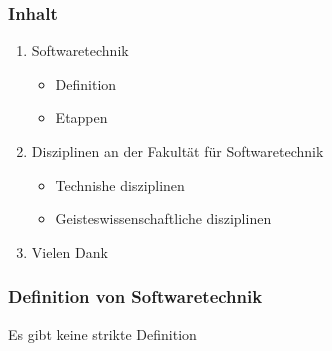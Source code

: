 \documentclass{beamer}
\begin{document}
\begin{frame}
\frametitle{Inhalt}
    \begin{enumerate}
            \item<1-> Softwaretechnik
                \begin{itemize}
                    \item<1-> Definition
                    \item<1-> Etappen
                \end{itemize}
            \item<1-> Disziplinen an der Fakultät für Softwaretechnik
                \begin{itemize}
                    \item<1-> Technishe disziplinen
                    \item<1-> Geisteswissenschaftliche disziplinen
                \end{itemize}
            \item<1-> Vielen Dank
    \end{enumerate}
\end{frame}

\begin{frame}
    \frametitle{Definition von Softwaretechnik}
    \centering
    \vfill
Es gibt keine strikte Definition
    \vfill
\end{frame}
\end{document}

